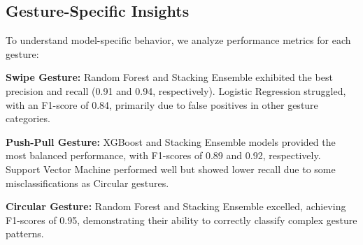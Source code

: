 \documentclass[10pt,twocolumn,letterpaper]{article}
\begin{document}
\begin{table}[h]
\small
\begin{center}
\caption{Comparative Performance Metrics for All Models}
\vspace{0.1cm}
\label{tab:comparative_metrics}
\end{center}
\end{table}


\subsection{Gesture-Specific Insights}

To understand model-specific behavior, we analyze performance metrics for each gesture:

\textbf{Swipe Gesture:}
Random Forest and Stacking Ensemble exhibited the best precision and recall (0.91 and 0.94, respectively).
Logistic Regression struggled, with an F1-score of 0.84, primarily due to false positives in other gesture categories.

\textbf{Push-Pull Gesture:}
XGBoost and Stacking Ensemble models provided the most balanced performance, with F1-scores of 0.89 and 0.92, respectively.
Support Vector Machine performed well but showed lower recall due to some misclassifications as Circular gestures.

\textbf{Circular Gesture:}
Random Forest and Stacking Ensemble excelled, achieving F1-scores of 0.95, demonstrating their ability to correctly classify complex gesture patterns.
\end{document}
